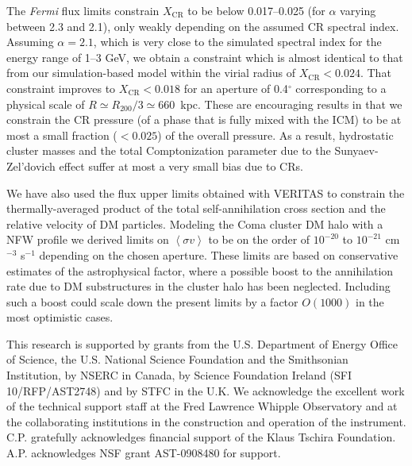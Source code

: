 \documentclass[12pt,manuscript]{aastex}
\def\Fermi{{\em Fermi}\xspace}
\newcommand{\expval}[1]{\left\langle #1 \right\rangle}
\newcommand{\CR}{\mathrm{CR}}
\begin{document}
The \Fermi flux limits constrain $X_\CR$ to be below 0.017--0.025 (for $\alpha$ varying
between 2.3 and 2.1), only weakly depending on the assumed CR spectral index. Assuming $\alpha=2.1$,
which is very close to the simulated spectral index for the energy range of 1--3 GeV, we obtain 
a constraint which is almost identical to that from our simulation-based model within the virial
radius of $X_\CR<0.024$. That constraint improves to $X_{\CR}<0.018$ for an aperture of 0.4$^\circ$
corresponding to a physical scale of $R \simeq R_{200}/3 \simeq 660$~kpc. These are encouraging
results in that we constrain the CR pressure (of a phase that is fully mixed with the ICM) to be at
most a small fraction ($<0.025$) of the overall pressure. As a result, hydrostatic cluster masses
and the total Comptonization parameter due to the Sunyaev-Zel'dovich effect suffer at most a very
small bias due to CRs.

We have also used the flux upper limits obtained with VERITAS to constrain the thermally-averaged
product of the total self-annihilation cross section and the relative velocity of DM
particles. Modeling the Coma cluster DM halo with a NFW profile we derived limits on
$\expval{\sigma v}$ to be on the order of $10^{-20}$ to $10^{-21}$ cm$^{-3}$ s$^{-1}$ depending on
the chosen aperture. These limits are based on conservative estimates of the astrophysical factor,
where a possible boost to the annihilation rate due to DM substructures in the cluster halo has
been neglected. Including such a boost could scale down the present limits by a factor $O(1000)$ in
the most optimistic cases.

\acknowledgments
This research is supported by grants from the U.S. Department of Energy Office of Science, the U.S.
National Science Foundation and the Smithsonian Institution, by NSERC in Canada, by Science
Foundation Ireland (SFI 10/RFP/AST2748) and by STFC in the U.K. We acknowledge the excellent work
of the technical support staff at the Fred Lawrence Whipple Observatory and at the collaborating
institutions in the construction and operation of the instrument. C.P. gratefully acknowledges 
financial support of the Klaus Tschira Foundation. A.P. acknowledges 
NSF grant AST-0908480 for support.




\end{document}
